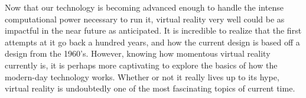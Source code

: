 \documentclass[12pt]{article}
\begin{document}
Now that our technology is becoming advanced enough to handle the intense computational power necessary to run it, virtual reality very well could be as impactful in the near future as anticipated. It is incredible to realize that the first attempts at it go back a hundred years, and how the current design is based off a design from the 1960's. \cite{grasnickBasicsVirtualReality2021a} However, knowing how momentous virtual reality currently is, it is perhaps more captivating to explore the basics of how the modern-day technology works. Whether or not it really lives up to its hype, virtual reality is undoubtedly one of the most fascinating topics of current time.

\pagebreak
\medskip
\printbibliography[heading=bibintoc ,title={Works Cited}]
\end{document}
